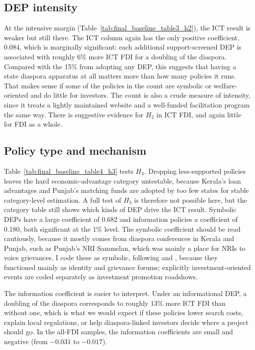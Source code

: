\documentclass[12pt]{article}
\begin{document}


\subsection{DEP intensity}

At the intensive margin (Table~\ref{tab:final_baseline_table3_h2}), the ICT result is weaker but still there. The ICT column again has the only positive coefficient, 0.084, which is marginally significant: each additional support-screened DEP is associated with roughly 6\% more ICT FDI for a doubling of the diaspora. Compared with the 15\% from adopting any DEP, this suggests that having a state diaspora apparatus at all matters more than how many policies it runs. That makes sense if some of the policies in the count are symbolic or welfare-oriented and do little for investors. The count is also a crude measure of intensity, since it treats a lightly maintained website and a well-funded facilitation program the same way. There is suggestive evidence for $H_2$ in ICT FDI, and again little for FDI as a whole.



\subsection{Policy type and mechanism}

Table~\ref{tab:final_baseline_table4_h3} tests $H_3$. Dropping less-supported policies leaves the hard economic-advantage category untestable, because Kerala's loan advantages and Punjab's matching funds are adopted by too few states for stable category-level estimation. A full test of $H_3$ is therefore not possible here, but the category table still shows which kinds of DEP drive the ICT result. Symbolic DEPs have a large coefficient of 0.682 and information policies a coefficient of 0.180, both significant at the 1\% level. The symbolic coefficient should be read cautiously, because it mostly comes from diaspora conferences in Kerala and Punjab, such as Punjab's NRI Sammelan, which was mainly a place for NRIs to voice grievances. I code these as symbolic, following \citet{gamlen_emigration_2008} and \citet{ragazzi_comparative_2014}, because they functioned mainly as identity and grievance forums; explicitly investment-oriented events are coded separately as investment promotion roadshows.

The information coefficient is easier to interpret. Under an informational DEP, a doubling of the diaspora corresponds to roughly 13\% more ICT FDI than without one, which is what we would expect if these policies lower search costs, explain local regulations, or help diaspora-linked investors decide where a project should go. In the all-FDI samples, the information coefficients are small and negative (from $-0.031$ to $-0.017$).
\end{document}
